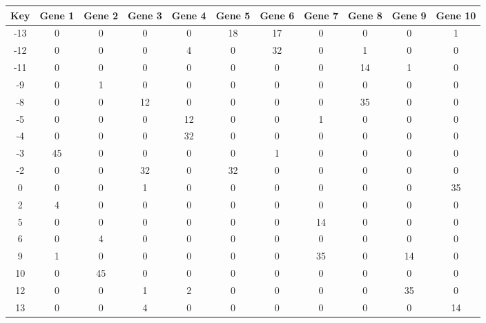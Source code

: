 \begin{tabular}{|c|c|c|c|c|c|c|c|c|c|c|}
\hline
Key & Gene 1 & Gene 2 & Gene 3 & Gene 4 & Gene 5 & Gene 6 & Gene 7 & Gene 8 & Gene 9 & Gene 10 \\
\hline
-13 & 0 & 0 & 0 & 0 & 18 & 17 & 0 & 0 & 0 & 1 \\
-12 & 0 & 0 & 0 & 4 & 0 & 32 & 0 & 1 & 0 & 0 \\
-11 & 0 & 0 & 0 & 0 & 0 & 0 & 0 & 14 & 1 & 0 \\
-9 & 0 & 1 & 0 & 0 & 0 & 0 & 0 & 0 & 0 & 0 \\
-8 & 0 & 0 & 12 & 0 & 0 & 0 & 0 & 35 & 0 & 0 \\
-5 & 0 & 0 & 0 & 12 & 0 & 0 & 1 & 0 & 0 & 0 \\
-4 & 0 & 0 & 0 & 32 & 0 & 0 & 0 & 0 & 0 & 0 \\
-3 & 45 & 0 & 0 & 0 & 0 & 1 & 0 & 0 & 0 & 0 \\
-2 & 0 & 0 & 32 & 0 & 32 & 0 & 0 & 0 & 0 & 0 \\
0 & 0 & 0 & 1 & 0 & 0 & 0 & 0 & 0 & 0 & 35 \\
2 & 4 & 0 & 0 & 0 & 0 & 0 & 0 & 0 & 0 & 0 \\
5 & 0 & 0 & 0 & 0 & 0 & 0 & 14 & 0 & 0 & 0 \\
6 & 0 & 4 & 0 & 0 & 0 & 0 & 0 & 0 & 0 & 0 \\
9 & 1 & 0 & 0 & 0 & 0 & 0 & 35 & 0 & 14 & 0 \\
10 & 0 & 45 & 0 & 0 & 0 & 0 & 0 & 0 & 0 & 0 \\
12 & 0 & 0 & 1 & 2 & 0 & 0 & 0 & 0 & 35 & 0 \\
13 & 0 & 0 & 4 & 0 & 0 & 0 & 0 & 0 & 0 & 14 \\
\hline
\end{tabular}